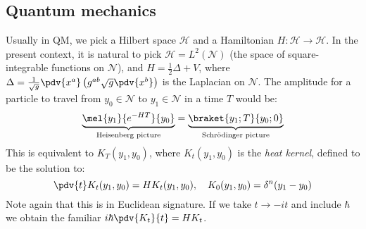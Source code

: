 \documentclass{jknotes}
\begin{document}
\subsection{Quantum mechanics}
Usually in QM, we pick a Hilbert space \(\mathcal{H}\) and a Hamiltonian \(H:\mathcal{H}\to\mathcal{H}\). In the present context, it is natural to pick \(\mathcal{H}=L^2(\mathcal{N})\) (the space of square-integrable functions on \(\mathcal{N}\)), and \(H = \frac{1}{2}\Delta + V\), where \(\Delta = \frac{1}{\sqrt{g}}\pdv{x^a}\left( g^{ab}\sqrt{g}\pdv{x^b} \right)\) is the Laplacian on \(\mathcal{N}\). The amplitude for a particle to travel from
\(y_0\in\mathcal{N}\) to \(y_1\in\mathcal{N}\) in a time \(T\) would be:
\begin{equation}
    \underbrace{\mel{y_1}{e^{-HT}}{y_0}}_{\text{Heisenberg picture}} 
    =
    \underbrace{\braket{y_1;T}{y_0;0}}_{\text{Schr\"odinger picture}}
\end{equation}
This is equivalent to \(K_T(y_1,y_0)\), where \(K_t(y_1,y_0)\) is the \emph{heat kernel}, defined to be the solution to:
\begin{equation}
    \pdv{t}K_t(y_1,y_0) = HK_t(y_1,y_0)
    ,\quad
    K_0(y_1,y_0) = \delta^n(y_1-y_0)
\end{equation}
Note again that this is in Euclidean signature. If we take \(t\to-it\) and include \(\hbar\) we obtain the familiar \(i\hbar\pdv{K_t}{t}=HK_t\).
\end{document}
